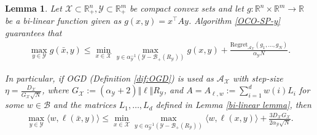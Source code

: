 \documentclass[a4paper,12pt]{article}
\newtheorem{lemma} {Lemma}
\newcommand{\mY}{\mathcal{Y}}
\newcommand{\mX}{\mathcal{X}}
\newcommand{\tY}{\tilde{\mathcal{Y}}}
\newcommand{\mA}{\mathcal{A}}
\newcommand{\mB}{\mathcal{B}}
\newcommand{\reals}{\mathbb{R}}
\newcommand{\oracley}{\mathcal{O}_{\mY}}
\begin{document}
\begin{lemma} \label{lemma:OCO-SP-y }
Let $\mX\subset \reals^n_+ , \mY\subset \reals^m_+$ be compact convex sets and let $g:\reals^n \times \reals^m \to \reals$ be a bi-linear function given as $g(x,y)=x^\top A y$. Algorithm \ref{OCO-SP-y} guarantees that
\begin{align}
\label{result1 OCO-SP-y}
\max_{y \in  \mY} g(\bar{x},y) \leq \min_{x\in \mX} \max_{y \in \alpha_{\mY}^{-1}(\mY- \mathcal{B}_+(R_\mY))} g(x,y)+ \frac{\text{Regret}_{\mathcal{A}_\mX}(g_1,\dots,g_N)}{\alpha_{\mY} N}.
\end{align}

In particular, if OGD (Definition \ref{dif:OGD}) is used as $\mA_{\mX}$ with step-size $\eta =\frac{D_{\mX}}{G_{\mX}\sqrt{N}}$, where $G_{\mX}:=(\alpha_\mY+2) \Vert \ell \Vert R_\mY$, and $A = A_{\ell,w} := \sum_{i=1}^dw(i)L_i$ for some $w\in\mB$ and the matrices $L_1,\dots,L_d$ defined in Lemma \ref{bi-linear lemma}, then 
\begin{align*}
\max_{y \in \mY} \langle{w,\ell(\bar{x},y)}\rangle \leq \min_{x\in \mX} \max_{y \in\alpha_{\mY}^{-1}(\mY- \mathcal{B}_+(R_\mY))} \langle{w,\ell(x,y)}\rangle + \frac{3 D_{\mX} G_{\mX}}{2\alpha_{\mY}\sqrt{N}}.
\end{align*}
\end{lemma}
\end{document}

